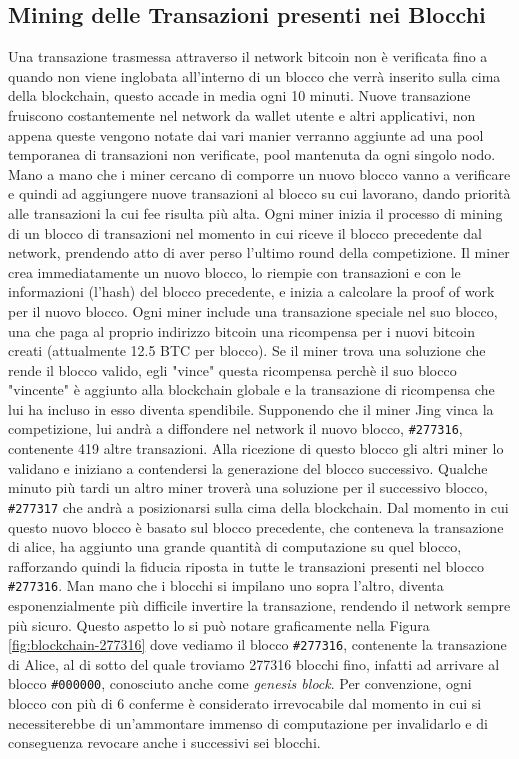 \subsection*{Mining delle Transazioni presenti nei Blocchi}
Una transazione trasmessa attraverso il network bitcoin non è verificata fino a quando non viene inglobata all'interno di un blocco che verrà inserito sulla cima della blockchain, questo accade in media ogni 10 minuti. Nuove transazione fruiscono costantemente nel network da wallet utente e altri applicativi, non appena queste vengono notate dai vari manier verranno aggiunte ad una pool temporanea di transazioni non verificate, pool mantenuta da ogni singolo nodo. Mano a mano che i miner cercano di comporre un nuovo blocco vanno a verificare e quindi ad aggiungere nuove transazioni al blocco su cui lavorano, dando priorità alle transazioni la cui fee risulta più alta. Ogni miner inizia il processo di mining di un blocco di transazioni nel momento in cui riceve il blocco precedente dal network, prendendo atto di aver perso l'ultimo round della competizione. Il miner crea immediatamente un nuovo blocco, lo riempie con transazioni e con le informazioni (l’hash) del blocco precedente, e inizia a calcolare la proof of work per il nuovo blocco. Ogni miner include una transazione speciale nel suo blocco, una che paga al proprio indirizzo bitcoin una ricompensa per i nuovi bitcoin creati (attualmente 12.5 BTC per blocco). Se il miner trova una soluzione che rende il blocco valido, egli "vince" questa ricompensa perchè il suo
blocco "vincente" è aggiunto alla blockchain globale e la transazione di ricompensa che lui ha incluso in esso diventa spendibile. Supponendo che il miner Jing vinca la competizione, lui andrà a diffondere nel network il nuovo blocco, \texttt{\#277316}, contenente 419 altre transazioni. Alla ricezione di questo blocco gli altri miner lo validano e iniziano a contendersi la generazione del blocco successivo. Qualche minuto più tardi un altro miner troverà una soluzione per il successivo blocco, \texttt{\#277317} che andrà a posizionarsi sulla cima della blockchain. Dal momento in cui questo nuovo blocco è basato sul blocco precedente, che conteneva la transazione di alice, ha aggiunto una grande quantità di computazione su quel blocco, rafforzando quindi la fiducia riposta in tutte le transazioni presenti nel blocco \texttt{\#277316}. Man mano che i blocchi si impilano uno sopra l’altro, diventa esponenzialmente più difficile invertire la transazione, rendendo il network sempre più sicuro. Questo aspetto lo si può notare graficamente nella Figura \ref{fig:blockchain-277316} dove vediamo il blocco \texttt{\#277316}, contenente la transazione di Alice, al di sotto del quale troviamo 277316 blocchi fino, infatti ad arrivare al blocco \texttt{\#000000}, conosciuto anche come \textit{genesis block}. Per convenzione, ogni blocco con più di 6 conferme è considerato irrevocabile dal momento in cui si necessiterebbe di un'ammontare immenso di computazione per invalidarlo e di conseguenza revocare anche i successivi sei blocchi.
